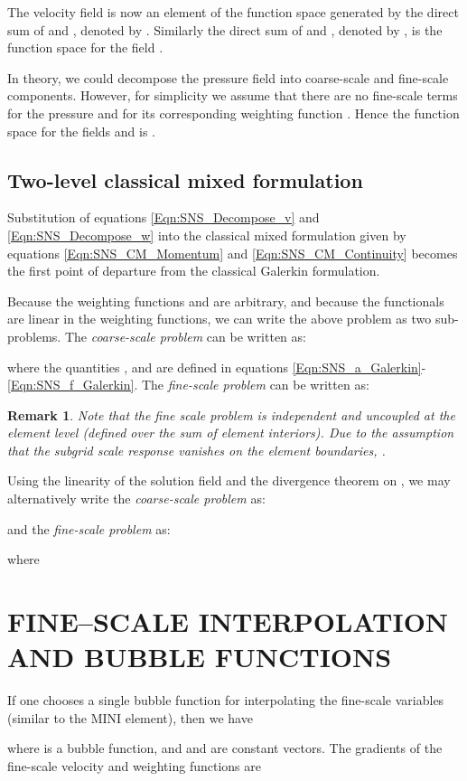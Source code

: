 \documentclass[11pt]{amsart}
\newtheorem{remark}[theorem]{Remark}
\begin{document}
The velocity field  is now an element of the function 
space generated by the direct sum of  and , denoted 
by . Similarly the direct sum of  
and , denoted by , is the function 
space for the field . 

In theory, we could decompose the pressure field into coarse-scale and fine-scale 
components. However, for simplicity we assume that there are no fine-scale terms 
for the pressure  and for its corresponding weighting function 
. Hence the function space for the fields  
and  is .
\subsection{Two-level classical mixed formulation}
Substitution of equations \eqref{Eqn:SNS_Decompose_v} and \eqref{Eqn:SNS_Decompose_w} 
into the classical mixed formulation given by equations \eqref{Eqn:SNS_CM_Momentum} and 
\eqref{Eqn:SNS_CM_Continuity} becomes the first point of departure from the 
classical Galerkin formulation. 


Because the weighting functions  and  
are arbitrary, and because the functionals are linear in the weighting functions, we can write 
the above problem as two sub-problems. The \emph{coarse-scale problem} can be written as:

where the quantities ,  and  
are defined in equations \eqref{Eqn:SNS_a_Galerkin}-\eqref{Eqn:SNS_f_Galerkin}. The 
\emph{fine-scale problem} can be written as:

\begin{remark}
Note that the fine scale problem is independent and uncoupled at the element level (defined over the sum of element interiors).  Due to the assumption that the subgrid scale response vanishes on the element boundaries, .
\end{remark}
Using the linearity of the solution field and the divergence theorem on , we may alternatively write the \emph{coarse-scale problem} as:

and the \emph{fine-scale problem} as: 

where 




 \section{FINE--SCALE INTERPOLATION AND BUBBLE FUNCTIONS}
If one chooses a single bubble function for interpolating the fine-scale variables (similar to the MINI element), then we have

where  is a bubble function, and  and  
are constant vectors. 
The gradients of the fine-scale velocity and weighting functions are
\end{document}
